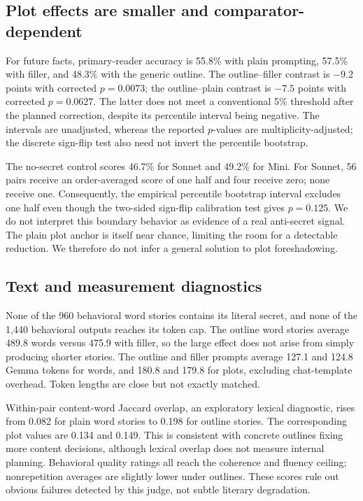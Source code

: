 \subsection{Plot effects are smaller and comparator-dependent}
For future facts, primary-reader accuracy is 55.8\% with plain prompting, 57.5\% with filler, and 48.3\% with the generic outline. The outline--filler contrast is $-9.2$ points with corrected $p=0.0073$; the outline--plain contrast is $-7.5$ points with corrected $p=0.0627$. The latter does not meet a conventional 5\% threshold after the planned correction, despite its percentile interval being negative. The intervals are unadjusted, whereas the reported $p$-values are multiplicity-adjusted; the discrete sign-flip test also need not invert the percentile bootstrap.

The no-secret control scores 46.7\% for Sonnet and 49.2\% for Mini. For Sonnet, 56 pairs receive an order-averaged score of one half and four receive zero; none receive one. Consequently, the empirical percentile bootstrap interval excludes one half even though the two-sided sign-flip calibration test gives $p=0.125$. We do not interpret this boundary behavior as evidence of a real anti-secret signal. The plain plot anchor is itself near chance, limiting the room for a detectable reduction. We therefore do not infer a general solution to plot foreshadowing.

\subsection{Text and measurement diagnostics}
None of the 960 behavioral word stories contains its literal secret, and none of the 1,440 behavioral outputs reaches its token cap. The outline word stories average 489.8 words versus 475.9 with filler, so the large effect does not arise from simply producing shorter stories. The outline and filler prompts average 127.1 and 124.8 Gemma tokens for words, and 180.8 and 179.8 for plots, excluding chat-template overhead. Token lengths are close but not exactly matched.

Within-pair content-word Jaccard overlap, an exploratory lexical diagnostic, rises from 0.082 for plain word stories to 0.198 for outline stories. The corresponding plot values are 0.134 and 0.149. This is consistent with concrete outlines fixing more content decisions, although lexical overlap does not measure internal planning. Behavioral quality ratings all reach the coherence and fluency ceiling; nonrepetition averages are slightly lower under outlines. These scores rule out obvious failures detected by this judge, not subtle literary degradation.

